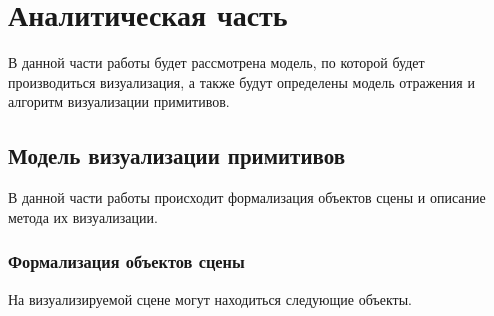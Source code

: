
\chapter{Аналитическая часть}
В данной части работы будет рассмотрена модель, по которой будет производиться
визуализация, а также будут определены модель отражения и алгоритм визуализации примитивов.
\section{Модель визуализации примитивов}
В данной части работы происходит формализация объектов сцены и описание метода их визуализации.

\subsection{Формализация объектов сцены}
\label{sec:obj_formalasation}
На визуализируемой сцене могут находиться следующие объекты.
